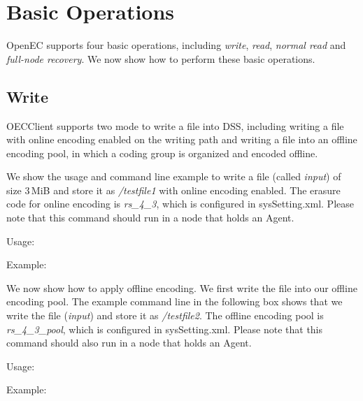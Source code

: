 \documentclass[letterpaper,12pt]{article}
\newcommand{\openec}{{\sf\small OpenEC}\xspace}
\begin{document}
\section{Basic Operations}

\openec supports four basic operations, including {\sl write}, {\sl read}, {\sl normal read} and
{\sl full-node recovery}. We now show how to perform these basic operations. 

\subsection{Write}

OECClient supports two mode to write a file into DSS, including writing a file with online encoding
enabled on the writing path and writing a file into an offline encoding pool, in which a coding group
is organized and encoded offline.

We show the usage and command line example to write a file (called {\sl input}) of 
size 3\,MiB and store it as {\sl /testfile1} with online encoding enabled. The erasure code 
for online encoding is {\sl rs\_4\_3}, which is configured in sysSetting.xml.
Please note that this command should run in a node that holds an Agent.

Usage:
\begin{center}
\noindent{}
\end{center}

Example:
\begin{center}
\noindent{}
\end{center}

We now show how to apply offline encoding. We first write the file into our offline encoding pool.
The example command line in the following box shows that we write the file ({\sl input}) and store
it as {\sl /testfile2}. The offline encoding pool is {\sl rs\_4\_3\_pool}, which is configured in sysSetting.xml.
Please note that this command should also run in a node that holds an Agent.

Usage:
\begin{center}
\noindent{}
\end{center}

Example:
\begin{center}
\noindent{}
\end{center}
\end{document}
